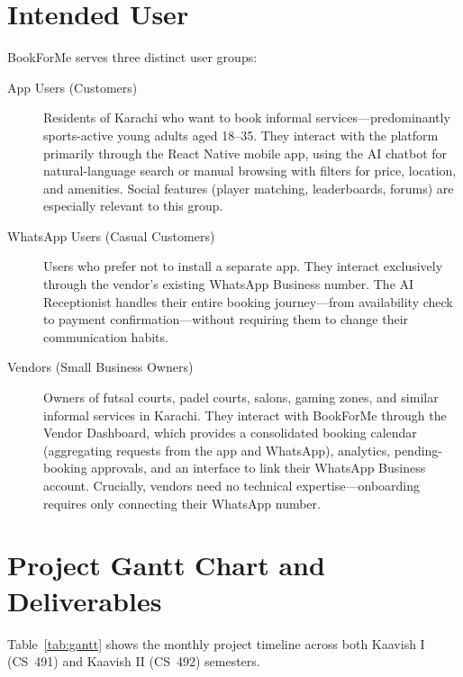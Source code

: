 \section{Intended User}
\label{sec:intro-users}

BookForMe serves three distinct user groups:

\begin{description}
  \item[App Users (Customers)] Residents of Karachi who want to book informal
        services---predominantly sports-active young adults aged 18--35.  They
        interact with the platform primarily through the React Native mobile app,
        using the AI chatbot for natural-language search or manual browsing with
        filters for price, location, and amenities.  Social features (player matching,
        leaderboards, forums) are especially relevant to this group.

  \item[WhatsApp Users (Casual Customers)] Users who prefer not to install a
        separate app.  They interact exclusively through the vendor's existing
        WhatsApp Business number.  The AI Receptionist handles their entire booking
        journey---from availability check to payment confirmation---without requiring
        them to change their communication habits.

  \item[Vendors (Small Business Owners)] Owners of futsal courts, padel courts,
        salons, gaming zones, and similar informal services in Karachi.  They interact
        with BookForMe through the Vendor Dashboard, which provides a consolidated
        booking calendar (aggregating requests from the app and WhatsApp), analytics,
        pending-booking approvals, and an interface to link their WhatsApp Business
        account.  Crucially, vendors need no technical expertise---onboarding requires
        only connecting their WhatsApp number.
\end{description}

\section{Project Gantt Chart and Deliverables}
\label{sec:intro-gantt}

Table~\ref{tab:gantt} shows the monthly project timeline across both Kaavish I
(CS~491) and Kaavish II (CS~492) semesters.

